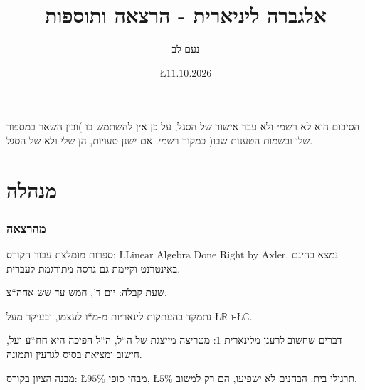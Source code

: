 \documentclass[english,hebrew]{article}
\begin{document}
\title{אלגברה ליניארית {\endL} - הרצאה {\endL} ותוספות}
\author{נעם לב}
\date{\L{$11.10.2026$}}

\maketitle
\noindent{}
\begin{center}
הסיכום הוא לא רשמי ולא עבר אישור של הסגל, על כן אין להשתמש בו )ובין
השאר במספור שלו ובשמות הטענות שבו( כמקור רשמי. אם ישנן טעויות, הן
שלי ולא של הסגל.
\par\end{center}

\medskip{}

\tableofcontents{}

\newpage{}

\part{מנהלה}

\section{מהרצאה {\endL}}

ספרות מומלצת עבור הקורס: \L{$\text{Linear Algebra Done Right by Axler}$},
נמצא בחינם באינטרנט וקיימת גם גרסה מתורגמת לעברית.

שעת קבלה: יום ד', חמש עד שש אחה\textquotedblleft צ. 

נתמקד בהעתקות לינאריות מ-מ\textquotedblleft ו לעצמו, ובעיקר מעל \L{$\mathbb{R}$}
ו-\L{$\mathbb{C}$}.

דברים שחשוב לרענן מלינארית 1: מטריצה מייצגת של ה\textquotedblleft ל,
ה\textquotedblleft ל הפיכה היא חח\textquotedblleft ע ועל, חישוב ומציאת
בסיס לגרעין ותמונה. 

מבנה הציון בקורס: \L{$95\%$} מבחן סופי, \L{$5\%$} תרגילי בית. הבחנים
לא ישפיעו, הם רק למשוב.
\end{document}
